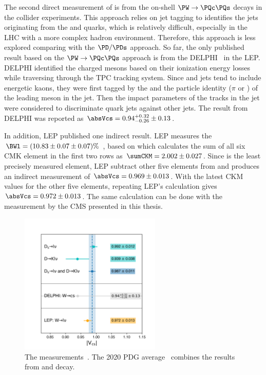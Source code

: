 The second direct measurement of \absVcs is from the on-shell $\PW\to \PQc \PQs$ decays in the collider experiments. This approach relies on jet tagging to identifies the jets originating from the \PQc and \PQs quarks, which is relatively difficult, especially in the LHC with a more complex hadron environment. Therefore, this approach is less explored comparing with the $\PD/\PDs$ approach. So far, the only published result based on the $\PW\to \PQc \PQs$  approach is from the DELPHI~\cite{Abreu:1998ap} in the LEP. DELPHI identified the charged mesons based on their ionization energy losses while traversing through the TPC tracking system. Since \PQs and \PQc jets tend to include energetic kaons, they were first tagged by the \pt and the particle identity ($\pi$ or \PK) of the leading meson in the jet. Then the impact parameters of the tracks in the jet were considered to discriminate \PQc quark jets against other jets. The result from DELPHI was reported as $\absVcs=0.94 ^{+0.32}_{-0.26}\pm 0.13$. 

In addition, LEP published one indirect result. LEP measures the $\BWl = (10.83 \pm 0.07 \pm 0.07) \%$ \cite{Schael:2013ita}, based on which calculates the sum of all six CMK element in the first two rows as $\sumCKM = 2.002 \pm 0.027$. Since \absVcs is the least precisely measured element, LEP subtract other five elements from \sumCKM and produces an indirect measurement of $\absVcs=0.969\pm 0.013$. With the latest CKM values for the other five elements, repeating LEP's calculation gives $\absVcs=0.972\pm 0.013$. The same calculation can be done with the \BWl measurement by the CMS presented in this thesis.


 \begin{figure}
    \centering
    \includegraphics[width=0.6\textwidth]{chapters/Introduction/sectionRelatedWorks/figures/vcs0.png}
    \caption{The \absVcs measurements~\cite{pdg2020}. The 2020 PDG average~\cite{pdg2020} combines the results from \PD and \PDs decay.}
    \label{fig:introduction:relatedWorks:vcs}
\end{figure}
